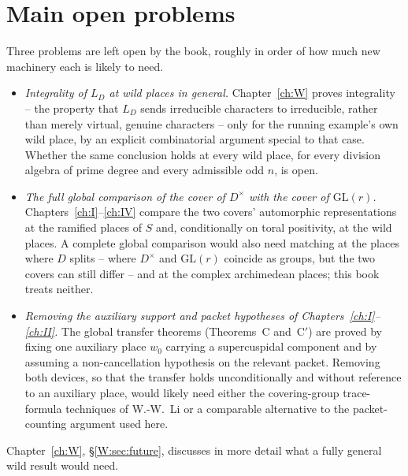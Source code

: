 \documentclass[11pt,oneside]{book}
\theoremstyle{plain}
\theoremstyle{definition}
\begin{document}
\section{Main open problems}
Three problems are left open by the book, roughly in order of how much new machinery each is likely to need.
\begin{itemize}[leftmargin=*]
\item \emph{Integrality of $L_D$ at wild places in general.} Chapter~\ref{ch:W} proves integrality -- the property that $L_D$ sends irreducible characters to irreducible, rather than merely virtual, genuine characters -- only for the running example's own wild place, by an explicit combinatorial argument special to that case. Whether the same conclusion holds at every wild place, for every division algebra of prime degree and every admissible odd $n$, is open.
\item \emph{The full global comparison of the cover of $D^\times$ with the cover of $\mathrm{GL}(r)$.} Chapters~\ref{ch:I}--\ref{ch:IV} compare the two covers' automorphic representations at the ramified places of $S$ and, conditionally on toral positivity, at the wild places. A complete global comparison would also need matching at the places where $D$ splits -- where $D^\times$ and $\mathrm{GL}(r)$ coincide as groups, but the two covers can still differ -- and at the complex archimedean places; this book treats neither.
\item \emph{Removing the auxiliary support and packet hypotheses of Chapters~\ref{ch:I}--\ref{ch:II}.} The global transfer theorems (Theorems~C and~C$'$) are proved by fixing one auxiliary place $w_0$ carrying a supercuspidal component and by assuming a non-cancellation hypothesis on the relevant packet. Removing both devices, so that the transfer holds unconditionally and without reference to an auxiliary place, would likely need either the covering-group trace-formula techniques of W.-W.~Li \cite{Li10,Li12,Li14} or a comparable alternative to the packet-counting argument used here.
\end{itemize}
Chapter~\ref{ch:W},
\S\ref{W:sec:future}, discusses in more detail what a fully general wild result would need.










\appendix


\backmatter


\cleardoublepage
{}
\printindex
\end{document}
